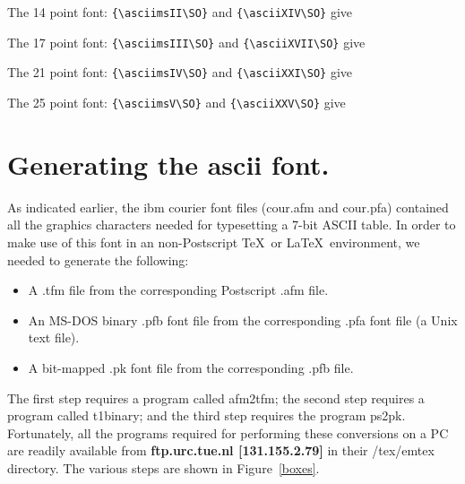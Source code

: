 \hspace*{1cm} The 14 point font: \verb#{\asciimsII\SO}# and \verb#{\asciiXIV\SO}#  give {\asciimsII \SO}

\hspace*{1cm} The 17 point font: \verb#{\asciimsIII\SO}# and
 \verb#{\asciiXVII\SO}#  give {\asciimsIII \SO}

\hspace*{1cm} The 21 point font: \verb#{\asciimsIV\SO}# and \verb#{\asciiXXI\SO}#  give {\asciimsIV \SO}

\hspace*{1cm} The 25 point font: \verb#{\asciimsV\SO}# and \verb#{\asciiXXV\SO}#  give {\asciimsV \SO}



\section {Generating the {\sc ascii} font.}

As indicated earlier, the {\sc ibm courier} font files ({\sc cour.afm}
and {\sc cour.pfa}) contained all the graphics characters  needed for
typesetting a 7-bit ASCII table. In order to make use of this font in an
non-Postscript \TeX\ or \LaTeX\ environment, we needed to generate the
following:
\begin{itemize}
\item A {\sc .tfm} file from the corresponding Postscript {\sc .afm} file.
\item An MS-DOS binary {\sc .pfb} font file from the corresponding
       {\sc .pfa} font file
   (a Unix text file).
\item A bit-mapped {\sc .pk} font file from the corresponding {\sc .pfb}
      file.
\end{itemize}

The first step requires a program called {\sc afm2tfm}; the second step
requires a program called {\sc t1binary};
and the third step requires the program {\sc ps2pk}.
Fortunately, all the programs required for performing these
conversions on a PC are readily available from {\bf ftp.urc.tue.nl
[131.155.2.79]} in their /{\sc tex}/{\sc emtex} directory.
The various steps are shown in Figure~\ref{boxes}.

